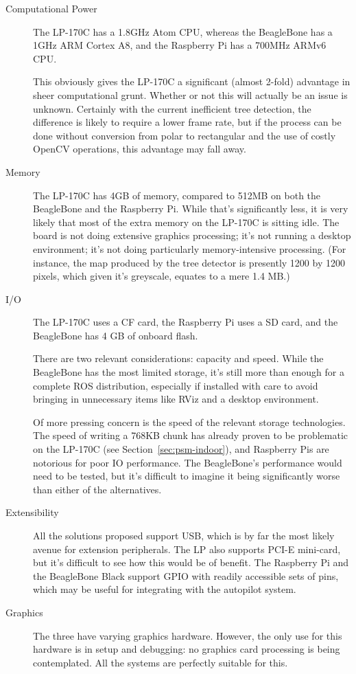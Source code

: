 \documentclass[12pt,oneside,a4paper,draft]{book}
\begin{document}
\begin{description}
\item[Computational Power] The LP-170C has a 1.8GHz Atom CPU, whereas
  the BeagleBone has a 1GHz ARM Cortex A8, and the Raspberry Pi has a
  700MHz ARMv6 CPU.

  This obviously gives the LP-170C a significant (almost 2-fold)
  advantage in sheer computational grunt. Whether or not this will
  actually be an issue is unknown. Certainly with the current
  inefficient tree detection, the difference is likely to require a
  lower frame rate, but if the process can be done without conversion
  from polar to rectangular and the use of costly OpenCV operations,
  this advantage may fall away.
\item[Memory] The LP-170C has 4GB of memory, compared to 512MB on both
  the BeagleBone and the Raspberry Pi. While that's significantly
  less, it is very likely that most of the extra memory on the LP-170C is sitting
  idle. The board is not doing extensive graphics processing; it's not
  running a desktop environment; it's not doing particularly
  memory-intensive processing. (For instance, the map produced by the
  tree detector is presently 1200 by 1200 pixels, which given it's
  greyscale, equates to a mere 1.4 MB.)
\item[I/O] The LP-170C uses a CF card, the Raspberry Pi uses a SD
  card, and the BeagleBone has 4 GB of onboard flash.

  There are two relevant considerations: capacity and speed. While the
  BeagleBone has the most limited storage, it's still more than enough
  for a complete ROS distribution, especially if installed with care
  to avoid bringing in unnecessary items like RViz and a desktop
  environment.

  Of more pressing concern is the speed of the relevant storage
  technologies. The speed of writing a 768KB chunk has already proven
  to be problematic on the LP-170C (see Section~\ref{sec:psm-indoor}),
  and Raspberry Pis are notorious for poor IO performance. The
  BeagleBone's performance would need to be tested, but it's difficult
  to imagine it being significantly worse than either of the
  alternatives.
\item[Extensibility] All the solutions proposed support USB, which is
  by far the most likely avenue for extension peripherals. The LP also
  supports PCI-E mini-card, but it's difficult to see how this would
  be of benefit. The Raspberry Pi and the BeagleBone Black support
  GPIO with readily accessible sets of pins, which may be useful for
  integrating with the autopilot system.
\item[Graphics] The three have varying graphics hardware. However, the
  only use for this hardware is in setup and debugging: no graphics
  card processing is being contemplated. All the systems are perfectly
  suitable for this.
\end{description}
\end{document}
